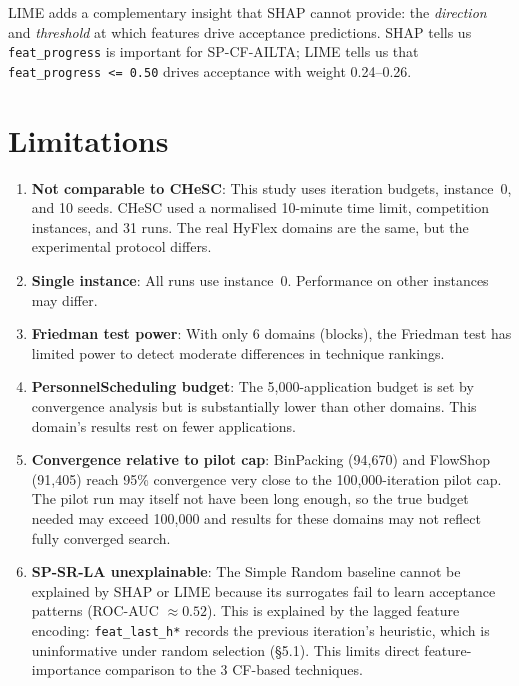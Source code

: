 \documentclass[11pt,a4paper]{article}
\begin{document}
LIME adds a complementary insight that SHAP cannot provide: the \emph{direction} and
\emph{threshold} at which features drive acceptance predictions. SHAP tells us
\texttt{feat\_progress} is important for SP-CF-AILTA; LIME tells us that
\texttt{feat\_progress <= 0.50} drives acceptance with weight 0.24--0.26.

\section{Limitations}

\begin{enumerate}
  \item \textbf{Not comparable to CHeSC}: This study uses iteration budgets,
    instance~0, and 10 seeds. CHeSC used a normalised 10-minute time limit,
    competition instances, and 31 runs. The real HyFlex domains are the same, but
    the experimental protocol differs.

  \item \textbf{Single instance}: All runs use instance~0. Performance on other
    instances may differ.

  \item \textbf{Friedman test power}: With only 6 domains (blocks), the Friedman test
    has limited power to detect moderate differences in technique rankings.

  \item \textbf{PersonnelScheduling budget}: The 5{,}000-application budget is set by
    convergence analysis but is substantially lower than other domains. This domain's
    results rest on fewer applications.

  \item \textbf{Convergence relative to pilot cap}: BinPacking (94{,}670) and FlowShop
    (91{,}405) reach 95\% convergence very close to the 100{,}000-iteration pilot cap.
    The pilot run may itself not have been long enough, so the true budget needed
    may exceed 100{,}000 and results for these domains may not reflect fully
    converged search.

  \item \textbf{SP-SR-LA unexplainable}: The Simple Random baseline cannot be
    explained by SHAP or LIME because its surrogates fail to learn acceptance
    patterns (ROC-AUC $\approx 0.52$). This is explained by the lagged
    feature encoding: \texttt{feat\_last\_h*} records the previous iteration's
    heuristic, which is uninformative under random selection (\S5.1).
    This limits direct feature-importance comparison to the 3 CF-based
    techniques.


\end{enumerate}
\end{document}
